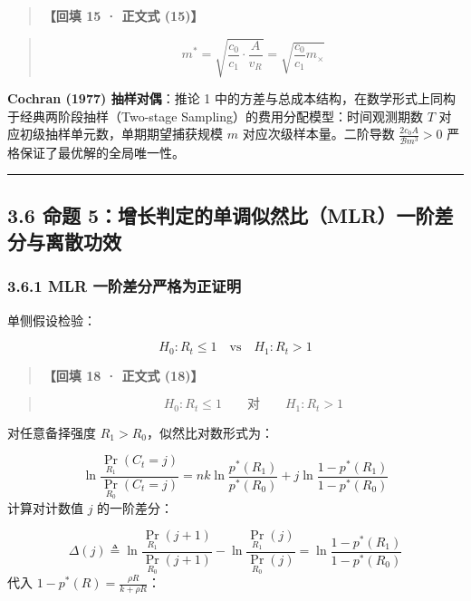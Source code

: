 \documentclass[11pt,a4paper]{ctexart}
\begin{document}
\begin{quote}\small\color{black!75}
\textbf{【回填 15 · 正文式 (15)】}
\end{quote}
\begin{quote}\small\color{black!75}
\begin{equation*}
m^* = \sqrt{\frac{c_0}{c_1} \cdot \frac{A}{v_R}} = \sqrt{\frac{c_0}{c_1} m_\times} \tag{eq:optimal\_scale}
\end{equation*}
\end{quote}

\textbf{Cochran (1977) 抽样对偶}：推论 1 中的方差与总成本结构，在数学形式上同构于经典两阶段抽样（Two-stage Sampling）的费用分配模型：时间观测期数 $T$ 对应初级抽样单元数，单期期望捕获规模 $m$ 对应次级样本量。二阶导数 $\frac{2c_0 A}{\mathcal{B} m^3} > 0$ 严格保证了最优解的全局唯一性。


\vspace{0.8em}\hrule\vspace{0.8em}

\subsection{3.6 命题 5：增长判定的单调似然比（MLR）一阶差分与离散功效}

\subsubsection{3.6.1 MLR 一阶差分严格为正证明}
单侧假设检验：

\[
H_0: R_t \le 1 \quad \text{vs} \quad H_1: R_t > 1
\]

\begin{quote}\small\color{black!75}
\textbf{【回填 18 · 正文式 (18)】}
\end{quote}
\begin{quote}\small\color{black!75}
\begin{equation*}
H_0: R_t \le 1 \qquad \text{对} \qquad H_1: R_t > 1 \tag{eq:hypo\_growth}
\end{equation*}
\end{quote}

对任意备择强度 $R_1 > R_0$，似然比对数形式为：

\[
\ln \frac{\Pr_{R_1}(C_t = j)}{\Pr_{R_0}(C_t = j)} = nk \ln \frac{p^*(R_1)}{p^*(R_0)} + j \ln \frac{1 - p^*(R_1)}{1 - p^*(R_0)}
\]
计算对计数值 $j$ 的一阶差分：

\[
\Delta(j) \triangleq \ln \frac{\Pr_{R_1}(j+1)}{\Pr_{R_0}(j+1)} - \ln \frac{\Pr_{R_1}(j)}{\Pr_{R_0}(j)} = \ln \frac{1 - p^*(R_1)}{1 - p^*(R_0)}
\]
代入 $1 - p^*(R) = \frac{\rho R}{k + \rho R}$：
\end{document}
